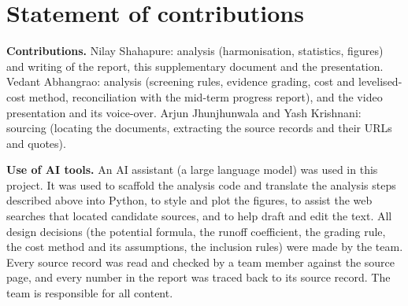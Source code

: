 \section{Statement of contributions}
\textbf{Contributions.} Nilay Shahapure: analysis (harmonisation, statistics, figures) and writing of the report, this supplementary document and the presentation. Vedant Abhangrao: analysis (screening rules, evidence grading, cost and levelised-cost method, reconciliation with the mid-term progress report), and the video presentation and its voice-over. Arjun Jhunjhunwala and Yash Krishnani: sourcing (locating the documents, extracting the source records and their URLs and quotes).

\textbf{Use of AI tools.} An AI assistant (a large language model) was used in this project. It was used to scaffold the analysis code and translate the analysis steps described above into Python, to style and plot the figures, to assist the web searches that located candidate sources, and to help draft and edit the text. All design decisions (the potential formula, the runoff coefficient, the grading rule, the cost method and its assumptions, the inclusion rules) were made by the team. Every source record was read and checked by a team member against the source page, and every number in the report was traced back to its source record. The team is responsible for all content.


